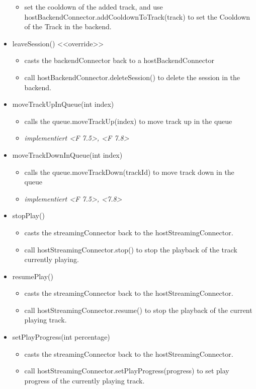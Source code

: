 \documentclass[oneside, ngerman]{sdqtechreport}
\begin{document}
\begin{itemize}
\begin{itemize}
        \item set the cooldown of the added track, and use hostBackendConnector.addCooldownToTrack(track) to set the Cooldown of the Track in the backend.
        \end{itemize}
    \item leaveSession() <<override>>
    \begin{itemize}
        \item casts the backendConnector back to a hostBackendConnector
        \item call hostBackendConnector.deleteSession() to delete the session in the backend. 
    \end{itemize}
    \item moveTrackUpInQueue(int index)
     \begin{itemize}
         \item calls the queue.moveTrackUp(index) to move track up in the queue
         \item \textit{implementiert <F 7.5>, <F 7.8>}
     \end{itemize}
     \item moveTrackDownInQueue(int index)
      \begin{itemize}
         \item calls the queue.moveTrackDown(trackId) to move track down in the queue
         \item \textit{implementiert <F 7.5>, <7.8>}
     \end{itemize}
     \item stopPlay()
     \begin{itemize}
         \item casts the streamingConnector back to the hostStreamingConnector.
         \item call hostStreamingConnector.stop() to stop the playback of the  track currently playing.
     \end{itemize}
     \item resumePlay()
     \begin{itemize}
         \item casts the streamingConnector back to the hostStreamingConnector.
         \item call hostStreamingConnector.resume() to stop the playback of the current playing track.
     \end{itemize}
     \item setPlayProgress(int percentage)
     \begin{itemize}
         \item casts the streamingConnector back to the hostStreamingConnector.
         \item call hostStreamingConnector.setPlayProgress(progress) to set play progress of the currently playing track.
     \end{itemize}
\end{itemize}
\end{document}
